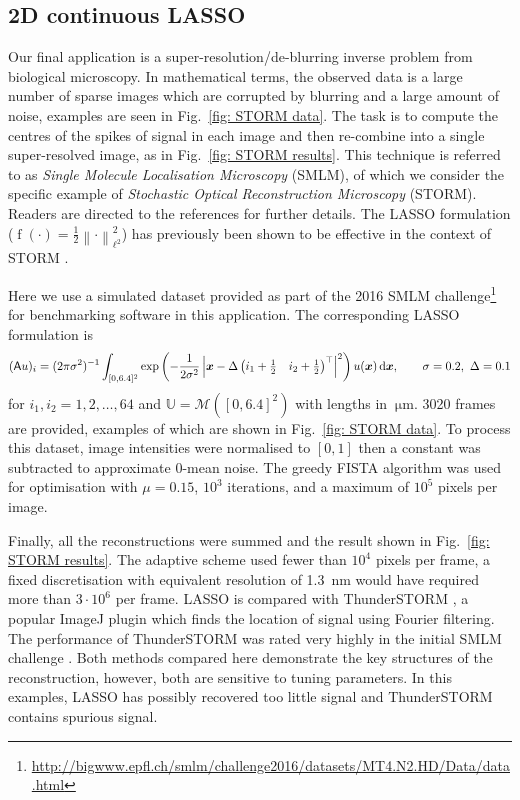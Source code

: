 \documentclass[smallextended]{svjour3}
\let\F\mathds\let\C\mathcal\newcommand{\R}{\F{R}}\newcommand{\A}{\tens{A}}
\newcommand{\norm}[1]{{\left\lVert #1 \right\rVert}}
\newcommand{\op}[1]{\operatorname{#1}}
\newcommand{\1}{\F{1}}
\newcommand{\diff}{\mathop{}\!\mathrm{d}}
\newcommand*{\var}[1]{%
	\IfEqCase{#1}{%
		{0}{u}%
		{1}{v}%
		{2}{w}%
	}[u#1]%
}
\begin{document}
	\subsection{2D continuous LASSO}
	Our final application is a super-resolution/de-blurring inverse problem from biological microscopy. In mathematical terms, the observed data is a large number of sparse images which are corrupted by blurring and a large amount of noise, examples are seen in Fig.~\ref{fig: STORM data}. The task is to compute the centres of the spikes of signal in each image and then re-combine into a single super-resolved image, as in Fig.~\ref{fig: STORM results}. This technique is referred to as \emph{Single Molecule Localisation Microscopy} (SMLM), of which we consider the specific example of \emph{Stochastic Optical Reconstruction Microscopy} (STORM). Readers are directed to the references \cite{Sage2015,Sage2019,Schermelleh2019} for further details. The LASSO formulation ($\op{f}(\cdot)=\frac12\norm{\cdot}_{\ell^2}^2$) has previously been shown to be effective in the context of STORM \cite{Huang2017,Denoyelle2019}.
	
	Here we use a simulated dataset provided as part of the 2016 SMLM challenge\footnote{\url{http://bigwww.epfl.ch/smlm/challenge2016/datasets/MT4.N2.HD/Data/data.html}} for benchmarking software in this application. The corresponding LASSO formulation is 
	\begin{equation}
		(\A\var0)_{i} = (2\pi\sigma^2)^{-1}\int_{[0,6.4]^2} \exp\left(-\frac{1}{2\sigma^2}\left|\vec{x}- \Delta\begin{pmatrix}i_1+\tfrac12 & i_2+\tfrac12\end{pmatrix}^\top \right|^2\right)\var0(\vec{x})\diff\vec{x}, \qquad \sigma=0.2,\ \Delta=0.1
	\end{equation}
	for $i_1,i_2 = 1,2,\ldots,64$ and $\F{U}=\C M([0,6.4]^2)$ with lengths in $\SI{}{\micro\meter}$. 3020 frames are provided, examples of which are shown in Fig.~\ref{fig: STORM data}. To process this dataset, image intensities were normalised to $[0,1]$ then a constant was subtracted to approximate 0-mean noise. The greedy FISTA algorithm was used for optimisation with $\mu=0.15$, $10^3$ iterations, and a maximum of $10^5$ pixels per image. 
	
	Finally, all the reconstructions were summed and the result shown in Fig.~\ref{fig: STORM results}. The adaptive scheme used fewer than $10^4$ pixels per frame, a fixed discretisation with equivalent resolution of \SI{1.3}{\nano\meter} would have required more than $3\cdot10^6$ per frame. LASSO is compared with ThunderSTORM \cite{Ovesny2014}, a popular ImageJ plugin \cite{Schindelin2012} which finds the location of signal using Fourier filtering. The performance of ThunderSTORM was rated very highly in the initial SMLM challenge \cite{Sage2015}. Both methods compared here demonstrate the key structures of the reconstruction, however, both are sensitive to tuning parameters. In this examples, LASSO has possibly recovered too little signal and ThunderSTORM contains spurious signal. 
	
\end{document}
